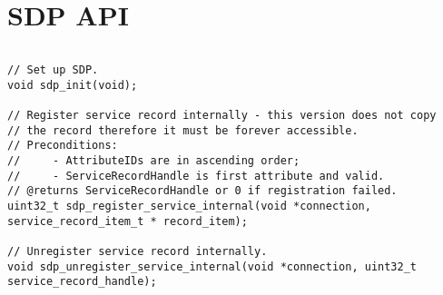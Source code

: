 \section{SDP API}
\label{appendix:api_sdp}
$ $
\begin{lstlisting}
// Set up SDP.
void sdp_init(void);

// Register service record internally - this version does not copy
// the record therefore it must be forever accessible.
// Preconditions:
//     - AttributeIDs are in ascending order;
//     - ServiceRecordHandle is first attribute and valid.
// @returns ServiceRecordHandle or 0 if registration failed.
uint32_t sdp_register_service_internal(void *connection, service_record_item_t * record_item);

// Unregister service record internally.
void sdp_unregister_service_internal(void *connection, uint32_t service_record_handle);
\end{lstlisting}
\pagebreak